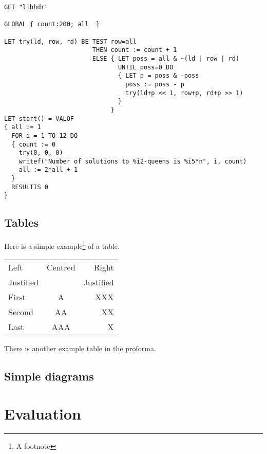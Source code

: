 \documentclass[12pt,twoside,notitlepage]{report}
\renewcommand{\baselinestretch}{1.1}    %
\begin{document}
{\renewcommand{\baselinestretch}{0.8}\small\begin{verbatim}
GET "libhdr"

GLOBAL { count:200; all  }

LET try(ld, row, rd) BE TEST row=all
                        THEN count := count + 1
                        ELSE { LET poss = all & ~(ld | row | rd)
                               UNTIL poss=0 DO
                               { LET p = poss & -poss
                                 poss := poss - p
                                 try(ld+p << 1, row+p, rd+p >> 1)
                               }
                             }
LET start() = VALOF
{ all := 1
  FOR i = 1 TO 12 DO
  { count := 0
    try(0, 0, 0)
    writef("Number of solutions to %i2-queens is %i5*n", i, count)
    all := 2*all + 1
  }
  RESULTIS 0
}
\end{verbatim}
}

\section{Tables}

\begin{samepage}
Here is a simple example\footnote{A footnote} of a table.

\begin{center}
\begin{tabular}{l|c|r}
Left      & Centred & Right \\
Justified &         & Justified \\[3mm]
First     & A       & XXX \\
Second    & AA      & XX  \\
Last      & AAA     & X   \\
\end{tabular}
\end{center}

\noindent
There is another example table in the proforma.
\end{samepage}

\section{Simple diagrams}




\cleardoublepage

\chapter{Evaluation}
\end{document}
